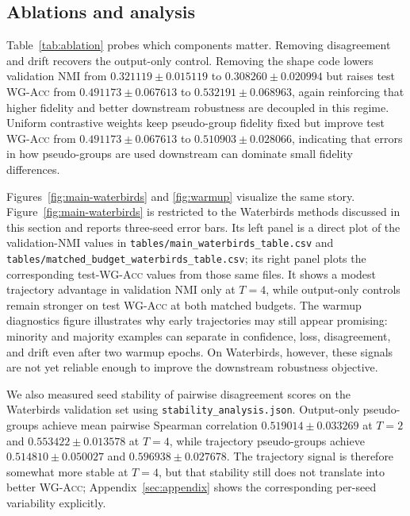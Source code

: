 \documentclass{article}
\newcommand{\wg}{\textsc{WG-Acc}}
\newcommand{\nmi}{\textsc{NMI}}
\begin{document}
\subsection{Ablations and analysis}
Table~\ref{tab:ablation} probes which components matter. Removing disagreement and drift recovers the output-only control. Removing the shape code lowers validation \nmi{} from $0.321119 \pm 0.015119$ to $0.308260 \pm 0.020994$ but raises test \wg{} from $0.491173 \pm 0.067613$ to $0.532191 \pm 0.068963$, again reinforcing that higher fidelity and better downstream robustness are decoupled in this regime. Uniform contrastive weights keep pseudo-group fidelity fixed but improve test \wg{} from $0.491173 \pm 0.067613$ to $0.510903 \pm 0.028066$, indicating that errors in how pseudo-groups are used downstream can dominate small fidelity differences.

Figures~\ref{fig:main-waterbirds} and \ref{fig:warmup} visualize the same story. Figure~\ref{fig:main-waterbirds} is restricted to the Waterbirds methods discussed in this section and reports three-seed error bars. Its left panel is a direct plot of the validation-\nmi{} values in \texttt{tables/main\_waterbirds\_table.csv} and \texttt{tables/matched\_budget\_waterbirds\_table.csv}; its right panel plots the corresponding test-\wg{} values from those same files. It shows a modest trajectory advantage in validation \nmi{} only at $T=4$, while output-only controls remain stronger on test \wg{} at both matched budgets. The warmup diagnostics figure illustrates why early trajectories may still appear promising: minority and majority examples can separate in confidence, loss, disagreement, and drift even after two warmup epochs. On Waterbirds, however, these signals are not yet reliable enough to improve the downstream robustness objective.

We also measured seed stability of pairwise disagreement scores on the Waterbirds validation set using \texttt{stability\_analysis.json}. Output-only pseudo-groups achieve mean pairwise Spearman correlation $0.519014 \pm 0.033269$ at $T=2$ and $0.553422 \pm 0.013578$ at $T=4$, while trajectory pseudo-groups achieve $0.514810 \pm 0.050027$ and $0.596938 \pm 0.027678$. The trajectory signal is therefore somewhat more stable at $T=4$, but that stability still does not translate into better \wg{}; Appendix~\ref{sec:appendix} shows the corresponding per-seed variability explicitly.
\end{document}

